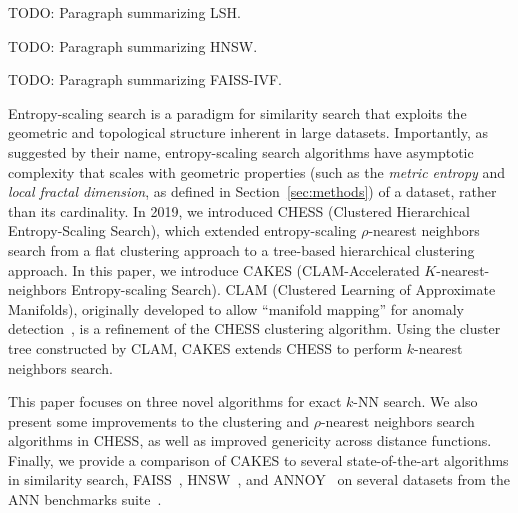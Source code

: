 TODO: Paragraph summarizing LSH.

TODO: Paragraph summarizing HNSW.

TODO: Paragraph summarizing FAISS-IVF.

Entropy-scaling search is a paradigm for similarity search that exploits the geometric and topological structure inherent in large datasets.
Importantly, as suggested by their name, entropy-scaling search algorithms have asymptotic complexity that scales with geometric properties (such as the \emph{metric entropy} and \emph{local fractal dimension}, as defined in Section~\ref{sec:methods}) of a dataset, rather than its cardinality.
In 2019, we introduced CHESS (Clustered Hierarchical Entropy-Scaling Search), which extended entropy-scaling $\rho$-nearest neighbors search from a flat clustering approach to a tree-based hierarchical clustering approach.
In this paper, we introduce CAKES (CLAM-Accelerated $K$-nearest-neighbors Entropy-scaling Search).
CLAM (Clustered Learning of Approximate Manifolds), originally developed to allow ``manifold mapping'' for anomaly detection~\cite{ishaq2021clustered}, is a refinement of the CHESS clustering algorithm. 
Using the cluster tree constructed by CLAM, CAKES extends CHESS to perform $k$-nearest neighbors search.

This paper focuses on three novel algorithms for exact $k$-NN search.
We also present some improvements to the clustering and $\rho$-nearest neighbors search algorithms in CHESS, as well as improved genericity across distance functions.
Finally, we provide a comparison of CAKES to several state-of-the-art algorithms in similarity search, FAISS~\cite{johnson2019billion}, HNSW~\cite{malkov2016hnsw}, and ANNOY~\cite{annoy} on several datasets from the ANN benchmarks suite~\cite{aumuller2020ann}.
